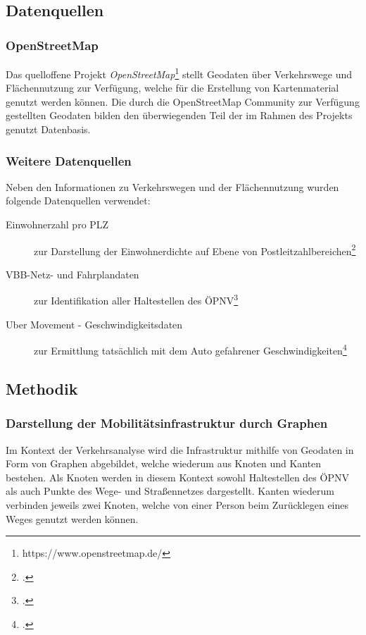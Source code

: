 \subsection{Datenquellen}
\label{frameworks_und_datenquellen}

\subsubsection{OpenStreetMap}
\label{open_street_map}

Das quelloffene Projekt \emph{OpenStreetMap}\footnote{https://www.openstreetmap.de/} stellt Geodaten über Verkehrswege und Flächennutzung zur Verfügung, welche für die Erstellung von Kartenmaterial genutzt werden können. Die durch die OpenStreetMap Community zur Verfügung gestellten Geodaten bilden den überwiegenden Teil der im Rahmen des Projekts genutzt Datenbasis.

\subsubsection{Weitere Datenquellen}
\label{datenquellen}

Neben den Informationen zu Verkehrswegen und der Flächennutzung wurden folgende Datenquellen verwendet:

\begin{description}
    \item[Einwohnerzahl pro PLZ] zur Darstellung der Einwohnerdichte auf Ebene von Postleitzahlbereichen\footcite{Einwohnerdaten}
    \item[VBB-Netz- und Fahrplandaten] zur Identifikation aller Haltestellen des \ac{ÖPNV}\footcite{Fahrplandaten}
    \item[Uber Movement - Geschwindigkeitsdaten] zur Ermittlung tatsächlich mit dem Auto gefahrener Geschwindigkeiten\footcite{Uberdaten}
\end{description}

\subsection{Methodik}
\label{methodik}

\subsubsection{Darstellung der Mobilitätsinfrastruktur durch Graphen}
\label{darstellung_der_mobiltaetsinfrastruktur_durch_graphen}

Im Kontext der Verkehrsanalyse wird die Infrastruktur mithilfe von Geodaten in Form von Graphen abgebildet, welche wiederum aus Knoten und Kanten bestehen. Als Knoten werden in diesem Kontext sowohl Haltestellen des \ac{ÖPNV} als auch Punkte des Wege- und Straßennetzes dargestellt. Kanten wiederum verbinden jeweils zwei Knoten, welche von einer Person beim Zurücklegen eines Weges genutzt werden können.

